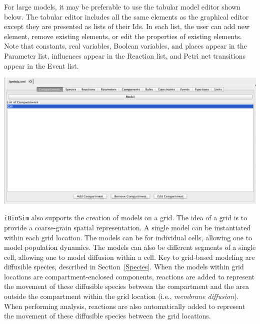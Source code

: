 \documentclass[titlepage,11pt]{article}
\begin{document}
For large models, it may be preferable to use the tabular model editor shown below.  The tabular editor includes all the same elements as the graphical editor except they are presented as lists of their Ids.  In each list, the user can add new element, remove existing elements, or edit the properties of existing elements.  Note that constants, real variables, Boolean variables, and places appear in the Parameter list, influences appear in the Reaction list, and Petri net transitions appear in the Event list.

\begin{center}
\includegraphics[width=160mm]{screenshots/textualEditor}
\end{center}

\noindent
{\tt iBioSim} also supports the creation of models on a grid.  The idea of a grid is to provide a coarse-grain spatial representation.  A single model can be instantiated within each grid location.  The models can be for individual cells, allowing one to model population dynamics.  The models can also be different segments of a single cell, allowing one to model diffusion within a cell.  Key to grid-based modeling are diffusible species, described in Section~\ref{Species}.  When the models within grid locations are compartment-enclosed components, reactions are added to represent the movement of these diffusible species between the compartment and the area outside the compartment within the grid location (i.e., \emph{membrane diffusion}).  When performing analysis, reactions are also automatically added to represent the movement of these diffusible species between the grid locations.  
\end{document}

